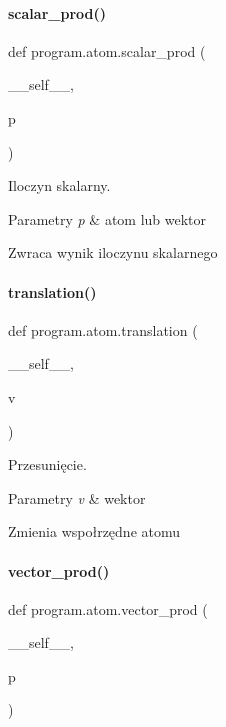 \paragraph{scalar\+\_\+prod()}
{\footnotesize\ttfamily def program.\+atom.\+scalar\+\_\+prod (\begin{DoxyParamCaption}\item[{}]{\+\_\+\+\_\+self\+\_\+\+\_\+,  }\item[{}]{p }\end{DoxyParamCaption})}



Iloczyn skalarny. 


\begin{DoxyParams}{Parametry}
{\em p} & atom lub wektor \\
\hline
\end{DoxyParams}
\begin{DoxyReturn}{Zwraca}
wynik iloczynu skalarnego 
\end{DoxyReturn}
\mbox{\label{classprogram_1_1atom_ab8c1cb9e73897ef7413e183a9986f744}} 
\paragraph{translation()}
{\footnotesize\ttfamily def program.\+atom.\+translation (\begin{DoxyParamCaption}\item[{}]{\+\_\+\+\_\+self\+\_\+\+\_\+,  }\item[{}]{v }\end{DoxyParamCaption})}



Przesunięcie. 


\begin{DoxyParams}{Parametry}
{\em v} & wektor\\
\hline
\end{DoxyParams}
Zmienia wspołrzędne atomu \mbox{\label{classprogram_1_1atom_ae8937a9e9eb716fe83cac0b0cd302a05}} 
\paragraph{vector\+\_\+prod()}
{\footnotesize\ttfamily def program.\+atom.\+vector\+\_\+prod (\begin{DoxyParamCaption}\item[{}]{\+\_\+\+\_\+self\+\_\+\+\_\+,  }\item[{}]{p }\end{DoxyParamCaption})}



